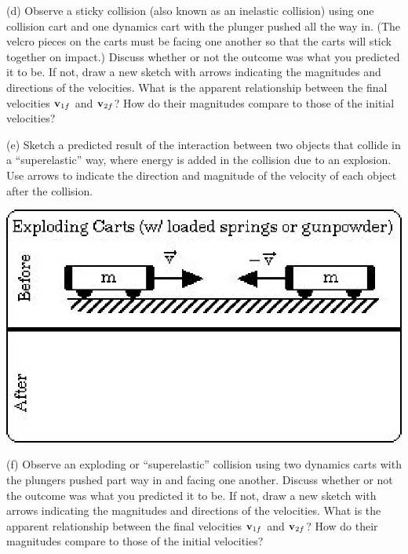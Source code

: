 (d) Observe a sticky collision (also known as an inelastic collision) using one collision cart and one dynamics cart with the plunger pushed all the way in. (The velcro pieces on the carts must be facing one another so that the carts will stick together on impact.) Discuss
whether or not the outcome was what you predicted it to be. If not, draw a new
sketch with arrows indicating the magnitudes and directions of the velocities.
What is the apparent relationship between the final velocities \( {{\bf v}_{1f}} \) and \( {{\bf v}_{2f}} \)? How do their magnitudes compare to those
of the initial velocities?
\vspace{20mm}

(e) Sketch a predicted result of the interaction between two objects that 
collide in a ``superelastic'' way, where energy is added in the collision due 
to an explosion. Use arrows to indicate the direction and magnitude of the
velocity of each object after the collision.

\vspace{0.3cm}
{\par\centering \includegraphics{mom_cons/mom_cons_fig5.eps} \par}
\vspace{0.3cm}

(f) Observe an exploding or ``superelastic'' collision using two dynamics carts with the plungers pushed part way in and facing one another. Discuss
whether or not the outcome was what you predicted it to be. If not, draw a new
sketch with arrows indicating the magnitudes and directions of the velocities.
What is the apparent relationship between the final velocities \( {{\bf v}_{1f}} \) and \( {{\bf v}_{2f}} \)? How do their magnitudes compare to those
of the initial velocities?
\vspace{20mm}

